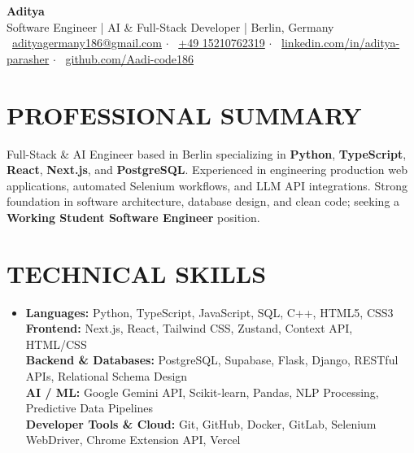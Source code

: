 \documentclass[a4paper,10pt]{article}
\begin{document}
\begin{center}
    \vspace{-8pt}
    {\Huge \bfseries \color{primary} Aditya} \\[3pt]
    \small \color{accent} Software Engineer \quad | \quad AI \& Full-Stack Developer \quad | \quad Berlin, Germany \\[3pt]
    \small 
    \faEnvelope\ \href{mailto:adityagermany186@gmail.com}{adityagermany186@gmail.com} \quad $\cdot$ \quad
    \faPhone\ \href{tel:+4915210762319}{+49 15210762319} \quad $\cdot$ \quad
    \faLinkedin\ \href{https://www.linkedin.com/in/aditya-parasher/}{linkedin.com/in/aditya-parasher} \quad $\cdot$ \quad
    \faGithub\ \href{https://github.com/Aadi-code186}{github.com/Aadi-code186}
    \vspace{-6pt}
\end{center}

\section*{PROFESSIONAL SUMMARY}
\small{
Full-Stack \& AI Engineer based in Berlin specializing in \textbf{Python}, \textbf{TypeScript}, \textbf{React}, \textbf{Next.js}, and \textbf{PostgreSQL}. Experienced in engineering production web applications, automated Selenium workflows, and LLM API integrations. Strong foundation in software architecture, database design, and clean code; seeking a \textbf{Working Student Software Engineer} position.
}

\section*{TECHNICAL SKILLS}
\begin{itemize}[leftmargin=0.15in, label={}]
  \item \small{
    \textbf{Languages:} Python, TypeScript, JavaScript, SQL, C++, HTML5, CSS3 \\
    \textbf{Frontend:} Next.js, React, Tailwind CSS, Zustand, Context API, HTML/CSS \\
    \textbf{Backend \& Databases:} PostgreSQL, Supabase, Flask, Django, RESTful APIs, Relational Schema Design \\
    \textbf{AI / ML:} Google Gemini API, Scikit-learn, Pandas, NLP Processing, Predictive Data Pipelines \\
    \textbf{Developer Tools \& Cloud:} Git, GitHub, Docker, GitLab, Selenium WebDriver, Chrome Extension API, Vercel
  }
\end{itemize}
\end{document}
